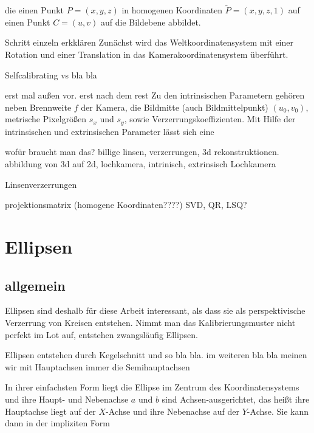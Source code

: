 die einen Punkt $P=(x,y,z)$ in homogenen Koordinaten $\tilde P = (x,y,z,1)$ auf einen Punkt $C = (u,v)$ auf die Bildebene abbildet.


Schritt einzeln erkklären
Zunächst wird das Weltkoordinatensystem mit einer Rotation und einer Translation in das Kamerakoordinatensystem überführt. 

Selfcalibrating vs bla bla

 erst mal außen vor. erst nach dem rest
Zu den intrinsischen Parametern gehören neben Brennweite $f$ der Kamera, die Bildmitte (auch Bildmittelpunkt) $(u_0, v_0)$, metrische Pixelgrößen $s_x$ und $s_y$, sowie Verzerrungskoeffizienten.
Mit Hilfe der intrinsischen und extrinsischen Parameter lässt sich eine 

wofür braucht man das? billige linsen, verzerrungen, 3d rekonstruktionen. abbildung von 3d auf 2d, lochkamera, intrinisch, extrinsisch
Lochkamera


Linsenverzerrungen

projektionsmatrix
(homogene Koordinaten????)
SVD, QR, LSQ?






\section{Ellipsen}
\label{s:ellipse}
\subsection{allgemein}
\label{s:ellipseGeneral}

Ellipsen sind deshalb für diese Arbeit interessant, als dass sie als perspektivische Verzerrung von Kreisen entstehen. Nimmt man das Kalibrierungsmuster nicht perfekt im Lot auf, entstehen zwangsläufig Ellipsen. 

\begin{definition}[Ellipse]
	Ellipsen entstehen durch 
	Kegelschnitt und so bla bla. im weiteren bla bla meinen wir mit Hauptachsen immer die Semihauptachsen
\end{definition}

In ihrer einfachsten Form liegt die Ellipse im Zentrum des Koordinatensystems und ihre Haupt- und Nebenachse $a$ und $b$ sind Achsen-ausgerichtet, das heißt ihre Hauptachse liegt auf der $X$-Achse und ihre Nebenachse auf der $Y$-Achse. Sie kann dann in der impliziten Form


